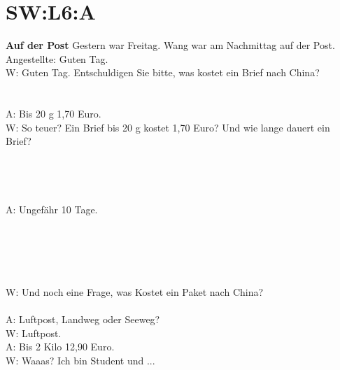 \section{SW:L6:A}
\textbf{Auf der Post}
\noindent
Gestern war Freitag. Wang war am Nachmittag auf der Post. \\
Angestellte: Guten Tag.  \\
W: Guten Tag. Entschuldigen Sie bitte, was kostet ein Brief nach China?  \\
\\
\\
\noindent
A: Bis 20 g 1,70 Euro. \\
W: So teuer? Ein Brief bis 20 g kostet 1,70 Euro? Und wie lange dauert ein Brief?  \\
\\
\\
\\
\\
\noindent
A: Ungefähr 10 Tage. \\
\\
\\
\\
\\
\\
\noindent
W: Und noch eine Frage, was Kostet ein Paket nach China?  \\
\\
\noindent
A: Luftpost, Landweg oder Seeweg? \\
W: Luftpost. \\
A: Bis 2 Kilo 12,90 Euro. \\
W: Waaas? Ich bin Student und ... \\

